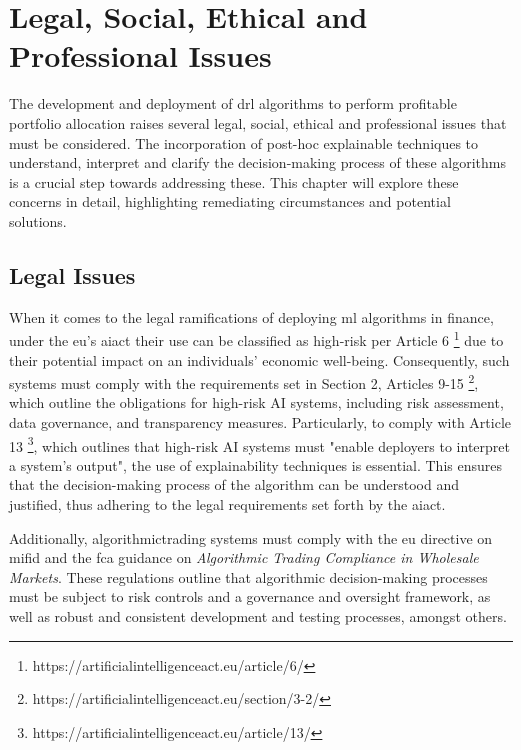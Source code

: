 \chapter{Legal, Social, Ethical and Professional Issues} \label{ch:issues}

The development and deployment of \acrfull{drl} algorithms to perform profitable portfolio allocation raises several legal, social, ethical and professional issues that must be considered. The incorporation of post-hoc explainable techniques to understand, interpret and clarify the decision-making process of these algorithms is a crucial step towards addressing these. This chapter will explore these concerns in detail, highlighting remediating circumstances and potential solutions.

\section{Legal Issues} \label{sec:legal-issues}

When it comes to the legal ramifications of deploying \acrfull{ml} algorithms in finance, under the \acrfull{eu}'s \acrfull{aiact} \cite{AIAct2024} their use can be classified as high-risk per Article 6 \footnote{https://artificialintelligenceact.eu/article/6/} due to their potential impact on an individuals' economic well-being. Consequently, such systems must comply with the requirements set in Section 2, Articles 9-15 \footnote{https://artificialintelligenceact.eu/section/3-2/}, which outline the obligations for high-risk AI systems, including risk assessment, data governance, and transparency measures. Particularly, to comply with Article 13 \footnote{https://artificialintelligenceact.eu/article/13/}, which outlines that high-risk AI systems must "enable deployers to interpret a system's output", the use of explainability techniques is essential. This ensures that the decision-making process of the algorithm can be understood and justified, thus adhering to the legal requirements set forth by the \acrshort{aiact}.

Additionally, \Gls{algorithmictrading} systems must comply with the \acrlong{eu} directive on \acrfull{mifid} \cite{MiFIDII} and the \acrfull{fca} guidance on \textit{Algorithmic Trading Compliance in Wholesale Markets}. These regulations outline that algorithmic decision-making processes must be subject to risk controls and a governance and oversight framework, as well as robust and consistent development and testing processes, amongst others. 

